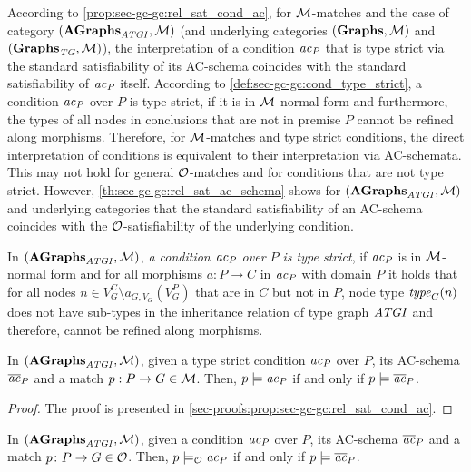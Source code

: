 According to \cref{prop:sec-gc-gc:rel_sat_cond_ac}, for ${\cal M}$-matches and the case of category $(\mathbf{AGraphs}_\mathit{ATGI},{\cal M})$ (and underlying categories $(\mathbf{Graphs},{\cal M})$ and $(\mathbf{Graphs}_\mathit{TG},{\cal M})$), the interpretation of a condition $\mathit{ac}_P$ that is type strict via the standard satisfiability of its AC-schema coincides with the standard satisfiability of $\mathit{ac}_P$ itself.
According to \cref{def:sec-gc-gc:cond_type_strict}, a condition $\mathit{ac}_P$ over $P$ is type strict, if it is in ${\cal M}$-normal form and furthermore, the types of all nodes in conclusions that are not in premise $P$ cannot be refined along morphisms.
Therefore, for ${\cal M}$-matches and type strict conditions, the direct interpretation of conditions is equivalent to their interpretation via AC-schemata.
This may not hold for general ${\cal O}$-matches and for conditions that are not type strict.
However, \cref{th:sec-gc-gc:rel_sat_ac_schema} shows for $(\mathbf{AGraphs}_\mathit{ATGI},{\cal M})$ and underlying categories that the standard satisfiability of an AC-schema coincides with the ${\cal O}$-satisfiability of the underlying condition.

\begin{definition}
\label{def:sec-gc-gc:cond_type_strict}
In $(\mathbf{AGraphs}_\mathit{ATGI},{\cal M})$, \emph{a condition $\mathit{ac}_P$ over $P$ is type strict}, if $\mathit{ac}_P$ is in ${\cal M}$-normal form and for all morphisms $a\colon P \to C$ in $\mathit{ac}_P$ with domain $P$ it holds that for all nodes $n \in V_G^C \setminus a_{G,V_G}(V_G^P)$ that are in $C$ but not in $P$, node type $\mathit{type}_C(n)$ does not have sub-types in the inheritance relation of type graph $\mathit{ATGI}$ and therefore, cannot be refined along morphisms.
\envEndMarker
\end{definition}

\begin{proposition}
\label{prop:sec-gc-gc:rel_sat_cond_ac}
In $(\mathbf{AGraphs}_\mathit{ATGI},{\cal M})$, given a type strict condition $\mathit{ac}_P$ over $P$, its AC-schema $\overline{\mathit{ac}}_P$ and a match $p:P \to G \in {\cal M}$.
Then, $p \models \mathit{ac}_P$ if and only if $p \models \overline{\mathit{ac}}_P$.
\envEndMarker
\end{proposition}

\begin{proof}
The proof is presented in \cref{sec-proofs:prop:sec-gc-gc:rel_sat_cond_ac}.
\end{proof}

\begin{proposition}
\label{th:sec-gc-gc:rel_sat_ac_schema}
In $(\mathbf{AGraphs}_\mathit{ATGI},{\cal M})$, given a condition $\mathit{ac}_P$ over $P$, its AC-schema $\overline{\mathit{ac}}_P$ and a match $p\colon P \to G \in {\cal O}$.
Then, $p \models_{{\cal O}} \mathit{ac}_P$ if and only if $p \models \overline{\mathit{ac}}_P$.
\envEndMarker
\end{proposition}

